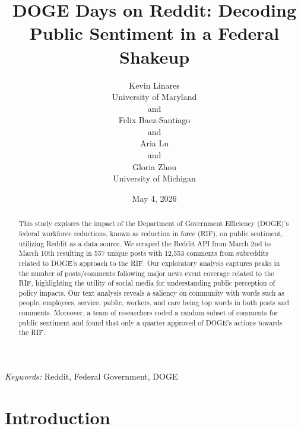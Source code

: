 \documentclass[
  12pt]{article}
\begin{document}
\def\spacingset#1{\renewcommand{\baselinestretch}%
{#1}\small\normalsize} \spacingset{1}



\date{May 4, 2026}
\title{\bf DOGE Days on Reddit: Decoding Public Sentiment in a Federal
Shakeup}
\author{
Kevin Linares\\
University of Maryland\\
and\\Felix Baez-Santiago\\
and\\Aria Lu\\
and\\Gloria Zhou\\
University of Michigan\\
}
\maketitle

\bigskip
\bigskip
\begin{abstract}
This study explores the impact of the Department of Government
Efficiency (DOGE)'s federal workforce reductions, known as reduction in
force (RIF), on public sentiment, utilizing Reddit as a data source. We
scraped the Reddit API from March 2nd to March 10th resulting in 557
unique posts with 12,553 comments from subreddits related to DOGE's
approach to the RIF. Our exploratory analysis captures peaks in the
number of posts/comments following major news event coverage related to
the RIF, highlighting the utility of social media for understanding
public perception of policy impacts. Our text analysis reveals a
saliency on community with words such as people, employees, service,
public, workers, and care being top words in both posts and comments.
Moreover, a team of researchers coded a random subset of comments for
public sentiment and found that only a quarter approved of DOGE's
actions towards the RIF.
\end{abstract}

\noindent%
{\it Keywords:} Reddit, Federal Government, DOGE
\vfill

\newpage
\spacingset{1.9} %


\section{Introduction}\label{sec-intro}
\end{document}
